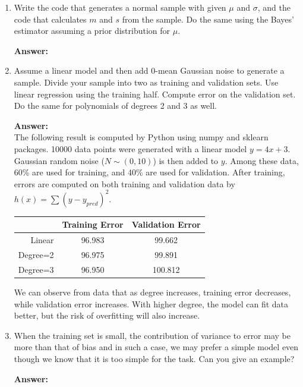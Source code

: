 \documentclass{article}
\begin{document}
\begin{enumerate}
    \item Write the code that generates a normal sample with given $\mu$ and $\sigma$, and the code that calculates $m$ and $s$ from the sample. Do the same using the Bayes’ estimator assuming a prior distribution for $\mu$. %
    
    \textbf{Answer:} \\

    \item  Assume a linear model and then add $0$-mean Gaussian noise to generate a sample. Divide your sample into two as training and validation sets. Use linear regression using the training half. Compute error on the validation set. Do the same for polynomials of degrees 2 and 3 as well. %
    
    \textbf{Answer:} \\
    The following result is computed by Python using numpy and sklearn packages. 10000 data points were generated with a linear model $y=4x+3$. Gaussian random noise ($N \sim (0, 10)$) is then added to $y$. Among these data, 60\% are used for training, and 40\% are used for validation. After training, errors are computed on both training and validation data by $h(x)=\sum (y-y_{pred})^2$.  %
    \begin{center}
        \begin{tabular}{rcc}
        \hline
                    & Training Error & Validation Error \\ \hline
        Linear   & 96.983      & 99.662           \\
        Degree=2 & 96.975      & 99.891           \\
        Degree=3 & 96.950      & 100.812          \\ \hline
    \end{tabular}
    \end{center}
    We can observe from data that as degree increases, training error decreases, while validation error increases. With higher degree, the model can fit data better, but the risk of overfitting will also increase.

    \item  When the training set is small, the contribution of variance to error may be more than that of bias and in such a case, we may prefer a simple model even though we know that it is too simple for the task. Can you give an example? %
    
    \textbf{Answer:} \\


\end{enumerate}
\end{document}
